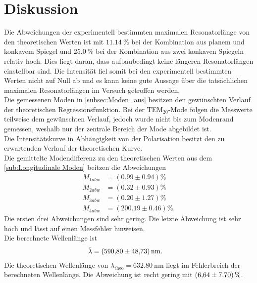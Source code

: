 \section{Diskussion}
\label{sec:Diskussion}

Die Abweichungen der experimentell bestimmten maximalen Resonatorlänge von den theoretischen Werten ist mit $\qty{11.14}{\percent}$ bei der Kombination
aus planem und konkavem Spiegel und $\qty{25.0}{\percent}$ bei der Kombination aus zwei konkaven Spiegeln relativ hoch.
Dies liegt daran, dass aufbaubedingt keine längeren Resonatorlängen einstellbar sind. Die Intensität fiel somit bei den experimentell bestimmten
Werten nicht auf Null ab und es kann keine gute Aussage über die tatsächlichen maximalen Resonatorlängen im Versuch getroffen werden.\\

Die gemessenen Moden in \autoref{subsec:Moden_aus} besitzen den gewünschten Verlauf der theoretischen Regressionsfunktion. Bei der TEM$_{20}$-Mode folgen die Messwerte teilweise dem gewünschten 
Verlauf, jedoch wurde nicht bis zum Modenrand gemessen, weshalb nur der zentrale Bereich der Mode abgebildet ist.\\


Die Intensitätskurve in Abhängigkeit von der Polarisation besitzt den zu erwartenden Verlauf der theoretischen Kurve.\\

Die gemittelte Modendifferenz zu den theoretischen Werten aus dem \autoref{sub:Longitudinale Moden} beitzen die Abweichungen
\begin{align*}
    M_{1 abw} &= (0.99 \pm 0.94) \si{\percent}\\
    M_{2 abw} &= (0.32 \pm 0.93) \si{\percent}\\
    M_{3 abw} &= (0.20 \pm 1.27) \si{\percent}\\
    M_{4 abw} &= (200.19 \pm 0.46) \si{\percent}.
\end{align*}
Die ersten drei Abweichungen sind sehr gering. Die letzte Abweichung ist sehr hoch und lässt auf einen Messfehler hinweisen.\\

Die berechnete Wellenlänge ist 
\begin{align*}
    \bar{\lambda} &= \qty{590.80 \pm 48.73}{\nano\meter}.
\end{align*}
Die theoretischen Wellenlänge von $\lambda_{\text{theo}}= \qty{632.80}{\nano\meter}$ liegt im Fehlerbreich der berechneten Wellenlänge. Die Abweichung ist recht gering mit 
$\qty{6.64 \pm 7.70}{\percent}$.\\